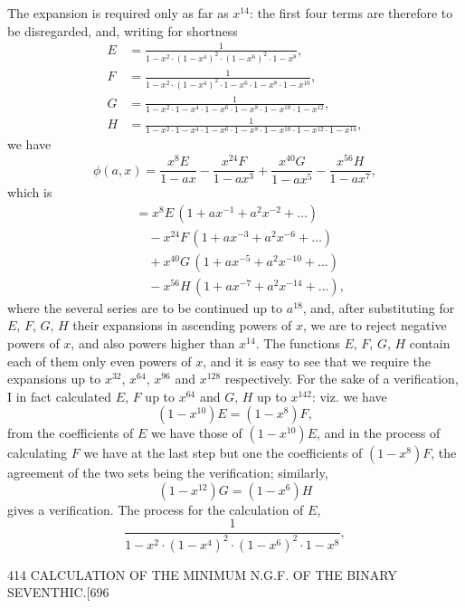 \documentclass[11pt]{article}
\begin{document}
The expansion is required only as far as $x^{14}$: the first four terms are therefore to be disregarded, and, writing for shortness
\begin{align*}
E &= \frac{1}{1 - x^{2}\cdot (1 - x^{4})^{2}\cdot (1 - x^{6})^{2}\cdot 1 - x^{8}},\\[2pt]
F &= \frac{1}{1 - x^{2}\cdot (1 - x^{4})^{2}\cdot 1 - x^{6}\cdot 1 - x^{8}\cdot 1 - x^{10}},\\[2pt]
G &= \frac{1}{1 - x^{2}\cdot 1 - x^{4}\cdot 1 - x^{6}\cdot 1 - x^{8}\cdot 1 - x^{10}\cdot 1 - x^{12}},\\[2pt]
H &= \frac{1}{1 - x^{2}\cdot 1 - x^{4}\cdot 1 - x^{6}\cdot 1 - x^{8}\cdot 1 - x^{10}\cdot 1 - x^{12}\cdot 1 - x^{14}},
\end{align*}
we have
\[ \phi(a, x) = \frac{x^{8} E}{1 - ax} - \frac{x^{24} F}{1 - ax^{3}} + \frac{x^{40} G}{1 - ax^{5}} - \frac{x^{56} H}{1 - ax^{7}}, \]
which is
\begin{align*}
&= x^{8} E\,(1 + ax^{-1} + a^{2} x^{-2} + \dots)\\
&\quad - x^{24} F\,(1 + ax^{-3} + a^{2} x^{-6} + \dots)\\
&\quad + x^{40} G\,(1 + ax^{-5} + a^{2} x^{-10} + \dots)\\
&\quad - x^{56} H\,(1 + ax^{-7} + a^{2} x^{-14} + \dots),
\end{align*}
where the several series are to be continued up to $a^{18}$, and, after substituting for $E$, $F$, $G$, $H$ their expansions in ascending powers of $x$, we are to reject negative powers of $x$, and also powers higher than $x^{14}$. The functions $E$, $F$, $G$, $H$ contain each of them only even powers of $x$, and it is easy to see that we require the expansions up to $x^{32}$, $x^{64}$, $x^{96}$ and $x^{128}$ respectively. For the sake of a verification, I in fact calculated $E$, $F$ up to $x^{64}$ and $G$, $H$ up to $x^{142}$: viz. we have
\[ (1 - x^{10}) E = (1 - x^{8}) F, \]
from the coefficients of $E$ we have those of $(1 - x^{10}) E$, and in the process of calculating $F$ we have at the last step but one the coefficients of $(1 - x^{8}) F$, the agreement of the two sets being the verification; similarly,
\[ (1 - x^{12}) G = (1 - x^{6}) H \]
gives a verification. The process for the calculation of $E$,
\[ \frac{1}{1 - x^{2}\cdot (1 - x^{4})^{2}\cdot (1 - x^{6})^{2}\cdot 1 - x^{8}}, \]

\clearpage
\begin{center}\small 414 \hfill CALCULATION OF THE MINIMUM N.G.F. OF THE BINARY SEVENTHIC.\hfill [696\end{center}
\end{document}
